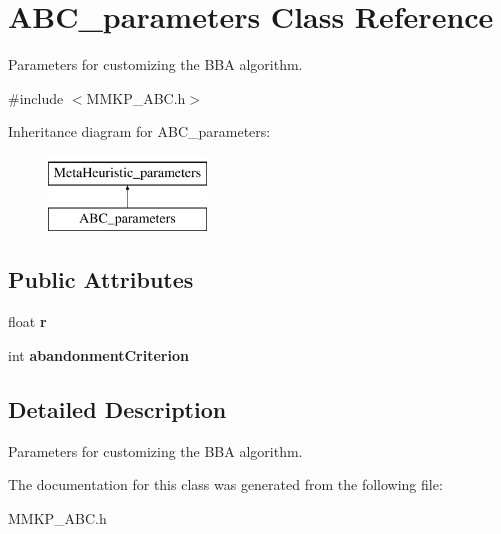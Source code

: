 \hypertarget{class_a_b_c__parameters}{\section{A\+B\+C\+\_\+parameters Class Reference}
\label{class_a_b_c__parameters}
}


Parameters for customizing the B\+B\+A algorithm.  




{\ttfamily \#include $<$M\+M\+K\+P\+\_\+\+A\+B\+C.\+h$>$}

Inheritance diagram for A\+B\+C\+\_\+parameters\+:\begin{figure}[H]
\begin{center}
\leavevmode
\includegraphics[height=2.000000cm]{class_a_b_c__parameters}
\end{center}
\end{figure}
\subsection*{Public Attributes}
\begin{DoxyCompactItemize}
\item 
\hypertarget{class_a_b_c__parameters_ad2cd650de529277f3e5249845eba4fe1}{float {\bfseries r}}\label{class_a_b_c__parameters_ad2cd650de529277f3e5249845eba4fe1}

\item 
\hypertarget{class_a_b_c__parameters_a490d2e6ae791674b74301ef614724c4a}{int {\bfseries abandonment\+Criterion}}\label{class_a_b_c__parameters_a490d2e6ae791674b74301ef614724c4a}

\end{DoxyCompactItemize}


\subsection{Detailed Description}
Parameters for customizing the B\+B\+A algorithm. 

The documentation for this class was generated from the following file\+:\begin{DoxyCompactItemize}
\item 
M\+M\+K\+P\+\_\+\+A\+B\+C.\+h\end{DoxyCompactItemize}
